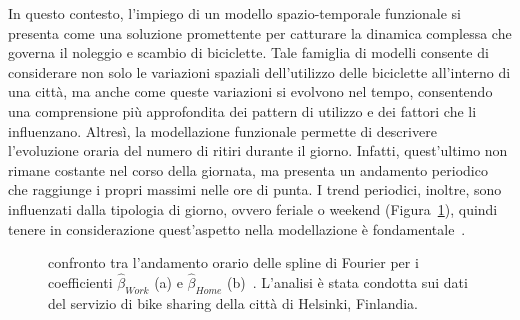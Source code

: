 \par In questo contesto, l'impiego di un modello spazio-temporale funzionale si presenta come una soluzione promettente per catturare la dinamica complessa che governa il noleggio e scambio di biciclette. Tale famiglia di modelli consente di considerare non solo le variazioni spaziali dell'utilizzo delle biciclette all'interno di una città, ma anche come queste variazioni si evolvono nel tempo, consentendo una comprensione più approfondita dei pattern di utilizzo e dei fattori che li influenzano. Altresì, la modellazione funzionale permette di descrivere l'evoluzione oraria del numero di ritiri durante il giorno. Infatti, quest'ultimo non rimane costante nel corso della giornata, ma presenta un andamento periodico che raggiunge i propri massimi nelle ore di punta. I trend periodici, inoltre, sono influenzati dalla tipologia di giorno, ovvero feriale o weekend (Figura~\ref{trend_paper_Otto}), quindi tenere in considerazione quest'aspetto nella modellazione è fondamentale~\citep{paper_bike_sharing_Otto}.

\begin{figure}[htpb]
	\centering
	\quad
	\quad
	\caption[Confronto tra l'andamento orario delle spline di Fourier per i coefficienti $\hat{\beta}_{Work}$ (a) e $\hat{\beta}_{Home}$ (b)]{confronto tra l'andamento orario delle spline di Fourier per i coefficienti $\hat{\beta}_{Work}$ (a) e $\hat{\beta}_{Home}$ (b)~\citep{paper_bike_sharing_Otto}. L'analisi è stata condotta sui dati del servizio di bike sharing della città di Helsinki, Finlandia.}
	\label{trend_paper_Otto}
\end{figure}


